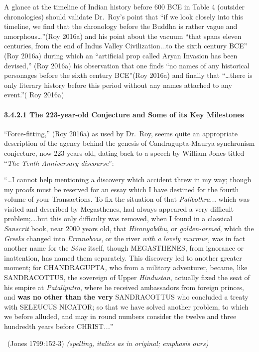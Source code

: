 A glance at the timeline of Indian history before 600 BCE in Table 4 (outsider chronologies) should validate Dr.~Roy’s point that “if we look closely into this timeline, we find that the chronology before the Buddha is rather vague and amorphous…”(Roy 2016a) and his point about the vacuum “that spans eleven centuries, from the end of Indus Valley Civilization...to the sixth century BCE” (Roy 2016a) during which an “artificial prop called Aryan Invasion has been devised,” (Roy 2016a) his observation that one finds “no names of any historical personages before the sixth century BCE”(Roy 2016a) and finally that “…there is only literary history before this period without any names attached to any event.”( Roy 2016a)


\paragraph*{3.4.2.1 The 223-year-old Conjecture and Some of its Key Milestones}

“Force-fitting,” (Roy 2016a) as used by Dr.~Roy, seems quite an appropriate description of the agency behind the genesis of Candragupta-Maurya synchronism conjecture, now 223 years old, dating back to a speech by William Jones titled “\textit{The Tenth Anniversary discourse}”:

\begin{myquote}
“…I cannot help mentioning a discovery which accident threw in my way; though my proofs must be reserved for an essay which I have destined for the fourth volume of your Transactions. To fix the situation of that \textit{Palibothra...} which was visited and described by Megasthenes, had always appeared a very difficult problem;….but this only difficulty was removed, when I found in a classical\textit{ Sanscrit} book, near 2000 years old, that \textit{Hiranyabáhu}, or \textit{golden-armed}, which the \textit{Greeks} changed into \textit{Erranoboas}, or the river \textit{with a} \textit{lovely murmur,} was in fact another name for the \textit{Sóna} itself, though MEGASTHENES, from ignorance or inattention, has named them separately. This discovery led to another greater moment; for CHANDRAGUPTA\textit{,} who from a military adventurer, became, like SANDRACOTTUS, the sovereign of Upper \textit{Hindustan}, actually fixed the seat of his empire at \textit{Pataliputra}, where he received ambassadors from foreign princes, and \textbf{was no other than the very} SANDRACOTTUS who concluded a treaty with SELEUCUS NICATOR; so that we have solved another problem, to which we before alluded, and may in round numbers consider the twelve and three hundredth years before CHRIST\textit{...}” 

~\hfill (Jones 1799:152-3) \textit{(spelling, italics as in original; emphasis ours)}
\end{myquote}


